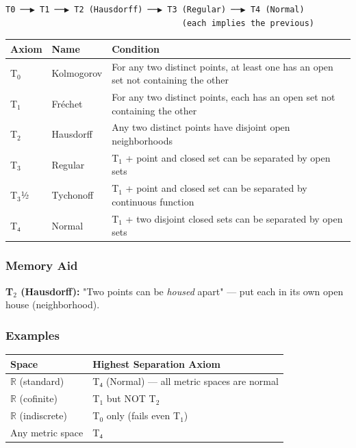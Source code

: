 \documentclass[12pt,a4paper,openany]{book}
\begin{document}
{{\begin{verbatim}
T0 ──▶ T1 ──▶ T2 (Hausdorff) ──▶ T3 (Regular) ──▶ T4 (Normal)
                                    (each implies the previous)
\end{verbatim}

\begin{center}
\begin{tabular}{|l|l|l|}
\hline
\textbf{Axiom} & \textbf{Name} & \textbf{Condition} \\
\hline
T$_0$ & Kolmogorov & For any two distinct points, at least one has an open set not containing the other \\
\hline
T$_1$ & Fréchet & For any two distinct points, each has an open set not containing the other \\
\hline
T$_2$ & Hausdorff & Any two distinct points have disjoint open neighborhoods \\
\hline
T$_3$ & Regular & T$_1$ + point and closed set can be separated by open sets \\
\hline
T$_3$½ & Tychonoff & T$_1$ + point and closed set can be separated by continuous function \\
\hline
T₄ & Normal & T$_1$ + two disjoint closed sets can be separated by open sets \\
\hline
\end{tabular}
\end{center}

\subsubsection{ Memory Aid}
\textbf{T$_2$ (Hausdorff):} "Two points can be \textit{housed} apart" — put each in its own open house (neighborhood).

\subsubsection{Examples}
\begin{center}
\begin{tabular}{|l|l|}
\hline
\textbf{Space} & \textbf{Highest Separation Axiom} \\
\hline
$\mathbb{R}$ (standard) & T₄ (Normal) — all metric spaces are normal \\
\hline
$\mathbb{R}$ (cofinite) & T$_1$ but NOT T$_2$ \\
\hline
$\mathbb{R}$ (indiscrete) & T$_0$ only (fails even T$_1$) \\
\hline
Any metric space & T₄ \\
\hline
\end{tabular}
\end{center}

}}
\end{document}
